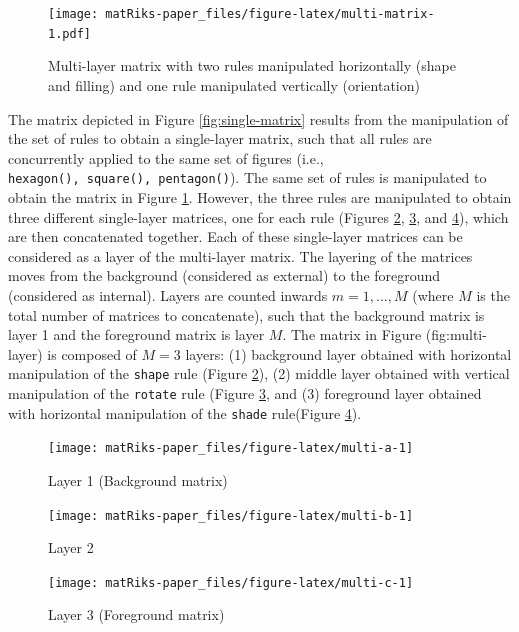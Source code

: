 \begin{figure}
\centering
\texttt{[image: matRiks-paper\_files/figure-latex/multi-matrix-1.pdf]}
\caption{\label{fig:multi-matrix}Multi-layer matrix with two rules manipulated horizontally (shape and filling) and one rule manipulated vertically (orientation)}
\end{figure}

The matrix depicted in Figure \ref{fig:single-matrix} results from the manipulation of the set of rules to obtain a single-layer matrix, such that all rules are concurrently applied to the same set of figures (i.e., \texttt{hexagon(),\ square(),\ pentagon()}).
The same set of rules is manipulated to obtain the matrix in Figure \ref{fig:multi-matrix}.
However, the three rules are manipulated to obtain three different single-layer matrices, one for each rule (Figures \ref{fig:multi-a}, \ref{fig:multi-b}, and \ref{fig:multi-c}), which are then concatenated together.
Each of these single-layer matrices can be considered as a layer of the multi-layer matrix.
The layering of the matrices moves from the background (considered as external) to the foreground (considered as internal).
Layers are counted inwards \(m = 1, \ldots, M\) (where \(M\) is the total number of matrices to concatenate), such that the background matrix is layer 1 and the foreground matrix is layer \(M\).
The matrix in Figure (fig:multi-layer) is composed of \(M = 3\) layers: (1) background layer obtained with horizontal manipulation of the \texttt{shape} rule (Figure \ref{fig:multi-a}), (2) middle layer obtained with vertical manipulation of the \texttt{rotate} rule (Figure \ref{fig:multi-b}, and (3) foreground layer obtained with horizontal manipulation of the \texttt{shade} rule(Figure \ref{fig:multi-c}).

\begin{figure}
\texttt{[image: matRiks-paper\_files/figure-latex/multi-a-1]} \caption{Layer 1 (Background matrix)}\label{fig:multi-a}
\end{figure}

\begin{figure}
\texttt{[image: matRiks-paper\_files/figure-latex/multi-b-1]} \caption{Layer 2}\label{fig:multi-b}
\end{figure}

\begin{figure}
\texttt{[image: matRiks-paper\_files/figure-latex/multi-c-1]} \caption{Layer 3 (Foreground matrix)}\label{fig:multi-c}
\end{figure}

